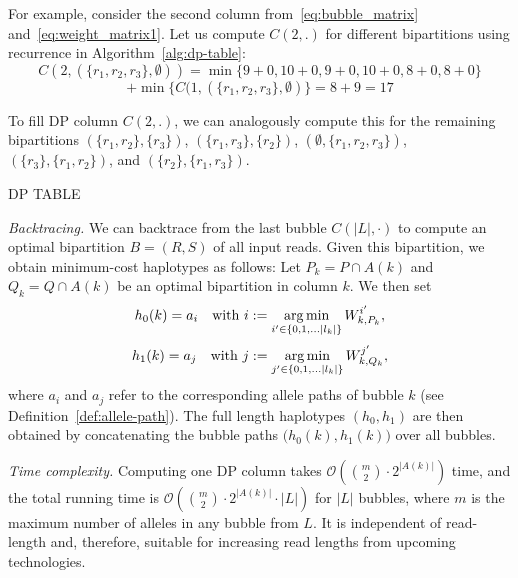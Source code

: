 For example, consider the second column from~\eqref{eq:bubble_matrix} and~\eqref{eq:weight_matrix1}. Let us compute $C(2,.)$ for different bipartitions using recurrence in Algorithm~\ref{alg:dp-table}:
\[C(2, (\{r_1,r_2,r_3\},\emptyset)) = \min\{9+0, 10+0, 9+0,10+0, 8+0, 8+0\} \]
\[ + \min\{C(1, (\{r_1,r_2,r_3\},\emptyset)\} = 8+9 = 17 \]

To fill DP column $C(2,.)$, we can analogously compute this for the remaining bipartitions $(\{r_1,r_2\},\{r_3\})$,
$(\{r_1,r_3\},\{r_2\})$, $(\emptyset,\{r_1,r_2,r_3\})$, $(\{r_3\},\{r_1,r_2\})$, and $(\{r_2\},\{r_1,r_3\})$.

\begin{algorithm}
    \caption{\label{alg:dp-table}\textsc{DP TABLE}}
\end{algorithm}

\textit{Backtracing.} We can backtrace from the last bubble $C(|L|, \cdot)$ to compute an optimal bipartition $B=(R,S)$ of all input reads.
Given this bipartition, we obtain minimum-cost haplotypes as follows:
Let $P_k=P\cap A(k)$ and $Q_k=Q\cap A(k)$ be an optimal bipartition in column $k$.
We then set
\begin{equation}\label{eqn:haplo_c1}
h_0(k)= a_i \quad \text{with } i:=\operatorname*{arg\,min}_{i'\in \{0,1, \ldots |l_k|\}} W_{k,{P_k}}^{i'}, \nonumber
\end{equation}
\begin{equation}\label{eqn:haplo_c2}
h_1(k)= a_j \quad \text{with } j:=\operatorname*{arg\,min}_{j'\in \{0,1, \ldots |l_k|\}} W_{k,{Q_k}}^{j'}, \nonumber
\end{equation}
where $a_i$ and $a_j$ refer to the corresponding allele paths of bubble $k$ (see Definition~\ref{def:allele-path}).
The full length haplotypes $(h_0, h_1)$ are then obtained by concatenating the bubble paths $\big(h_0(k), h_1(k)\big)$ over all bubbles.

\textit{Time complexity.} 
Computing one DP column takes $\mathcal{O}( {m \choose 2} \cdot 2^{|A(k)|})$ time, and the total running time is $\mathcal{O}( {m \choose 2} \cdot 2^{|A(k)|} \cdot |L|)$ for $|L|$ bubbles, where $m$ is the maximum number of alleles in any bubble from $L$. 
It is independent of read-length and, therefore, suitable for increasing read lengths from upcoming technologies.



